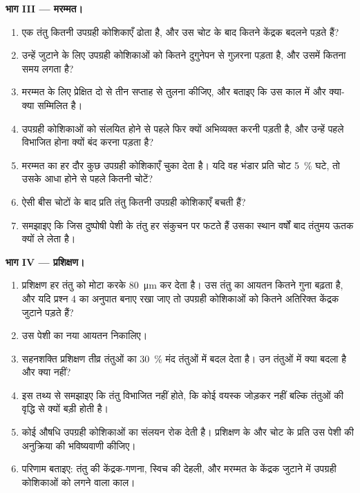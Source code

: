 \begin{problem}
\medskip
\noindent\textbf{भाग III --- मरम्मत।}
\begin{enumerate}[resume]
  \item एक तंतु कितनी उपग्रही कोशिकाएँ ढोता है, और उस चोट के बाद कितने
        केंद्रक बदलने पड़ते हैं?
  \item उन्हें जुटाने के लिए उपग्रही कोशिकाओं को कितने दुगुनेपन से
        गुज़रना पड़ता है, और उसमें कितना समय लगता है?
  \item मरम्मत के लिए प्रेक्षित दो से तीन सप्ताह से तुलना कीजिए, और
        बताइए कि उस काल में और क्या-क्या सम्मिलित है।
  \item उपग्रही कोशिकाओं को संलयित होने से पहले  फिर क्यों
        अभिव्यक्त करनी पड़ती है, और उन्हें पहले विभाजित होना क्यों बंद करना पड़ता है?
  \item मरम्मत का हर दौर कुछ उपग्रही कोशिकाएँ चुका देता है। यदि वह
        भंडार प्रति चोट \qty{5}{\%} घटे, तो उसके आधा होने से पहले कितनी
        चोटें?
  \item ऐसी बीस चोटों के बाद प्रति तंतु कितनी उपग्रही कोशिकाएँ बचती हैं?
  \item समझाइए कि जिस दुष्पोषी पेशी के तंतु हर संकुचन पर फटते हैं उसका
        स्थान वर्षों बाद तंतुमय ऊतक क्यों ले लेता है।
\end{enumerate}

\medskip
\noindent\textbf{भाग IV --- प्रशिक्षण।}
\begin{enumerate}[resume]
  \item प्रशिक्षण हर तंतु को मोटा करके \qty{80}{\micro m} कर देता है।
        उस तंतु का आयतन कितने गुना बढ़ता है, और यदि प्रश्न 4 का अनुपात
        बनाए रखा जाए तो उपग्रही कोशिकाओं को कितने अतिरिक्त
        केंद्रक जुटाने पड़ते हैं?
  \item उस पेशी का नया आयतन निकालिए।
  \item सहनशक्ति प्रशिक्षण तीव्र तंतुओं का \qty{30}{\%} मंद तंतुओं में
        बदल देता है। उन तंतुओं में क्या बदला है और क्या नहीं?
  \item इस तथ्य से समझाइए कि तंतु विभाजित नहीं होते, कि कोई वयस्क  जोड़कर नहीं बल्कि तंतुओं की वृद्धि से क्यों बड़ी होती है।
  \item कोई औषधि उपग्रही कोशिकाओं का संलयन रोक देती है। प्रशिक्षण के
        और चोट के प्रति उस पेशी की अनुक्रिया की भविष्यवाणी कीजिए।
  \item परिणाम बताइए: तंतु की केंद्रक-गणना, स्विच की देहली,
        और मरम्मत के केंद्रक जुटाने में उपग्रही कोशिकाओं को लगने वाला काल।
\end{enumerate}
\end{problem}
